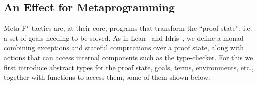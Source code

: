 \documentclass[runningheads]{llncs}
\newcommand\fstar{F$^\star$\xspace}
\newcommand\metafstar{Meta-F$^\star$\xspace}
\newcommand{\comm}[3]{\ifcheckpagebudget\else\ifdraft{{\color{#1}[#2: #3]}}\fi\fi}
\newcommand{\nik}[1]{\comm{dkpurple}{Nik}{#1}}
\newcommand{\ch}[1]{\comm{teal}{CH}{#1}}
\newcommand{\guido}[1]{\comm{blue}{Guido}{#1}}
\begin{document}
%  
%  

\subsection{An Effect for Metaprogramming}
\label{sec:tac-effect}

\metafstar tactics are, at their core, programs that transform the
``proof state'', i.e. a set of goals needing to be solved.
%
As in Lean~\cite{EbnerURAM17} and
Idris~\cite{ChristiansenB16}, we define a monad combining exceptions
and stateful computations over a proof state,
along with actions that can access internal components such as the
type-checker.
%
For this we first introduce abstract types for the proof state,
goals, terms, environments, etc., together with functions to
access them, some of them shown below.



\end{document}
